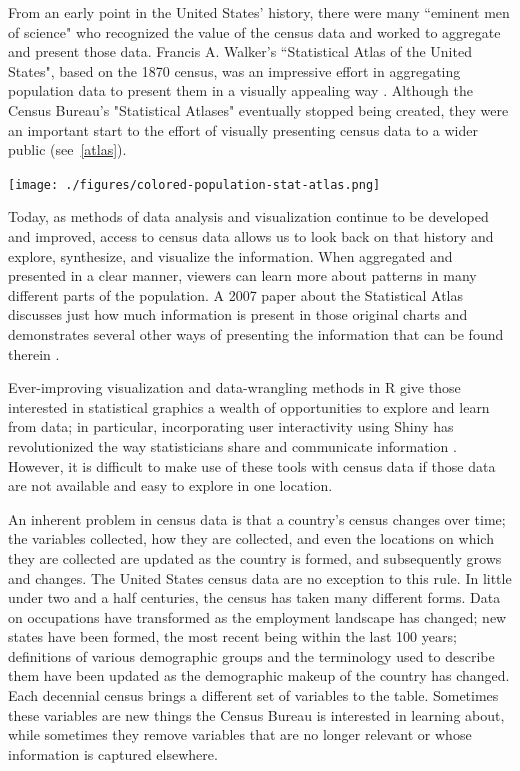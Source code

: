 \documentclass[DIV=calc, paper=a4, fontsize=10pt, twocolumn]{scrartcl}\usepackage[]{graphicx}\usepackage[]{color}
\begin{document}
\par From an early point in the United States' history, there were many ``eminent men of science" who recognized the value of the census data and worked to aggregate and present those data. Francis A. Walker's ``Statistical Atlas of the United States", based on the 1870 census, was an impressive effort in aggregating population data to present them in a visually appealing way \citep{StatisticalAtlas}. Although the Census Bureau's "Statistical Atlases" eventually stopped being created, they were an important start to the effort of visually presenting census data to a wider public (see~\autoref{atlas}).

\begin{center}
\texttt{[image: ./figures/colored-population-stat-atlas.png]}  
\label{atlas}
\end{center}

\par Today, as methods of data analysis and visualization continue to be developed and improved, access to census data allows us to look back on that history and explore, synthesize, and visualize the information. When aggregated and presented in a clear manner, viewers can learn more about patterns in many different parts of the population. A 2007 paper about the Statistical Atlas discusses just how much information is present in those original charts and demonstrates several other ways of presenting the information that can be found therein \citep{ChartInterview}.  

\par Ever-improving visualization and data-wrangling methods in R \citep{RCoreTeam} give those interested in statistical graphics a wealth of opportunities to explore and learn from data; in particular, incorporating user interactivity using Shiny has revolutionized the way statisticians share and communicate information \citep{Shiny}. However, it is difficult to make use of these tools with census data if those data are not available and easy to explore in one location.  

\par An inherent problem in census data is that a country's census changes over time; the variables collected, how they are collected, and even the locations on which they are collected are updated as the country is formed, and subsequently grows and changes. The United States census data are no exception to this rule. In little under two and a half centuries, the census has taken many different forms. Data on occupations have transformed as the employment landscape has changed; new states have been formed, the most recent being within the last 100 years; definitions of various demographic groups and the terminology used to describe them have been updated as the demographic makeup of the country has changed. Each decennial census brings a different set of variables to the table. Sometimes these variables are new things the Census Bureau is interested in learning about, while sometimes they remove variables that are no longer relevant or whose information is captured elsewhere.  
\end{document}
